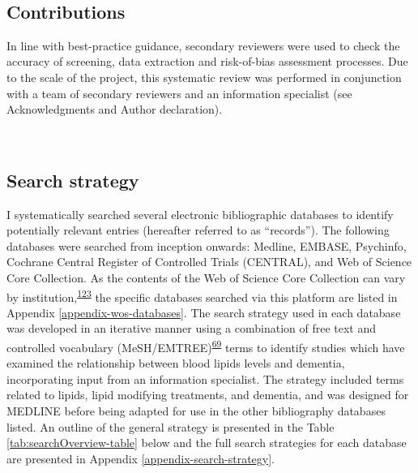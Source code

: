 \documentclass[a4paper, twoside]{templates/ociamthesis}
\begin{document}
~

\hypertarget{contributions}{%
\subsection{Contributions}\label{contributions}}

In line with best-practice guidance, secondary reviewers were used to check the accuracy of screening, data extraction and risk-of-bias assessment processes. Due to the scale of the project, this systematic review was performed in conjunction with a team of secondary reviewers and an information specialist (see Acknowledgments and Author declaration).

~

\hypertarget{search-strategy}{%
\subsection{Search strategy}\label{search-strategy}}

I systematically searched several electronic bibliographic databases to identify potentially relevant entries (hereafter referred to as ``records''). The following databases were searched from inception onwards: Medline, EMBASE, Psychinfo, Cochrane Central Register of Controlled Trials (CENTRAL), and Web of Science Core Collection. As the contents of the Web of Science Core Collection can vary by institution,\textsuperscript{\protect\hyperlink{ref-gusenbauer2020a}{123}} the specific databases searched via this platform are listed in Appendix \ref{appendix-wos-databases}. The search strategy used in each database was developed in an iterative manner using a combination of free text and controlled vocabulary (MeSH/EMTREE)\textsuperscript{\protect\hyperlink{ref-lefebvre2019searching}{69}} terms to identify studies which have examined the relationship between blood lipids levels and dementia, incorporating input from an information specialist. The strategy included terms related to lipids, lipid modifying treatments, and dementia, and was designed for MEDLINE before being adapted for use in the other bibliography databases listed. An outline of the general strategy is presented in the Table \ref{tab:searchOverview-table} below and the full search strategies for each database are presented in Appendix \ref{appendix-search-strategy}.

~
\end{document}
